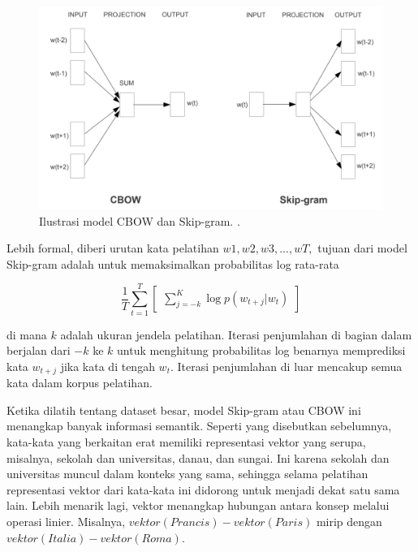     \begin{figure}[ht]
        \centering
        \includegraphics[width=1\textwidth]{resources/cbow-skip-gram-illustration.png}
        \caption{Ilustrasi model CBOW dan Skip-gram. \parencite{MikolovExploiting}.}
        \label{fig:ilustrasi_cbow_skip_gram}
    \end{figure}
    
    Lebih formal, diberi urutan kata pelatihan \(w1, w2, w3,. . . , wT,\) tujuan dari model Skip-gram adalah untuk memaksimalkan probabilitas log rata-rata

    \begin{equation}
        \frac{1}{T}\sum_{t=1}^{T}\begin{bmatrix}
        \sum_{j=-k}^{K}{\log p(w_{t+j}|w_{t})}
        \end{bmatrix}
        \label{eq:1}
    \end{equation}

    di mana \(k\) adalah ukuran jendela pelatihan. Iterasi penjumlahan di bagian dalam berjalan dari \({-k}\) ke \(k\) untuk menghitung probabilitas log benarnya memprediksi kata \(w_{t+j}\) jika kata di tengah \(w_{t}\). Iterasi penjumlahan di luar mencakup semua kata dalam korpus pelatihan. 


    Ketika dilatih tentang dataset besar, model Skip-gram atau CBOW ini menangkap banyak informasi semantik. Seperti yang disebutkan sebelumnya, kata-kata yang berkaitan erat memiliki representasi vektor yang serupa, misalnya, sekolah dan universitas, danau, dan sungai. Ini karena sekolah dan universitas muncul dalam konteks yang sama, sehingga selama pelatihan representasi vektor dari kata-kata ini didorong untuk menjadi dekat satu sama lain. Lebih menarik lagi, vektor menangkap hubungan antara konsep melalui operasi linier. Misalnya, \(vektor(Prancis) - vektor(Paris)\) mirip dengan \(vektor(Italia) - vektor(Roma)\).

